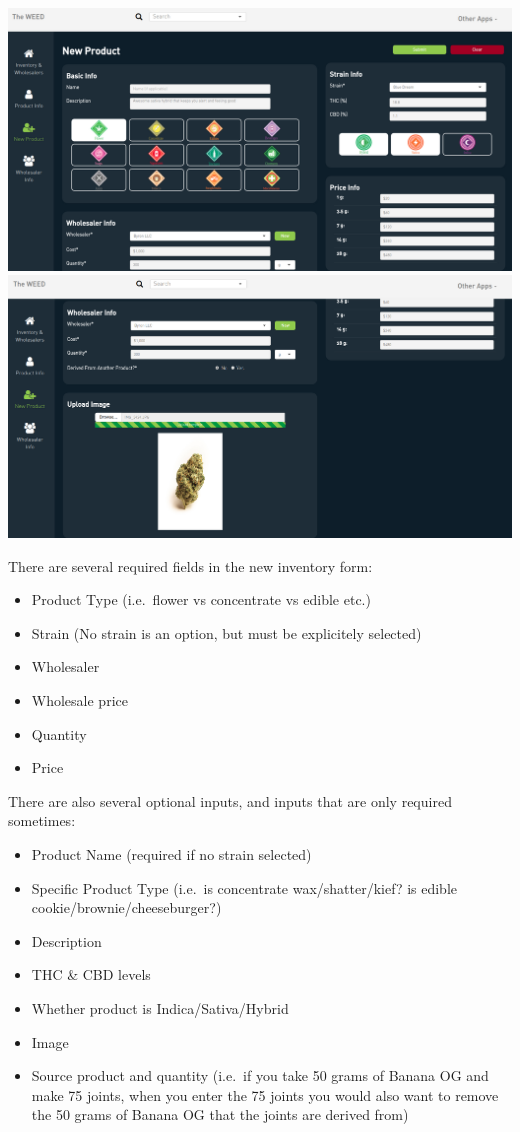 \documentclass[]{book}
\theoremstyle{definition}
\theoremstyle{definition}
\theoremstyle{definition}
\theoremstyle{remark}
\begin{document}
\includegraphics{images/newInv3.png}
\includegraphics{images/newInv4.png}

There are several required fields in the new inventory form:

\begin{itemize}
\item
  Product Type (i.e.~flower vs concentrate vs edible etc.)
\item
  Strain (No strain is an option, but must be explicitely selected)
\item
  Wholesaler
\item
  Wholesale price
\item
  Quantity
\item
  Price
\end{itemize}

There are also several optional inputs, and inputs that are only
required sometimes:

\begin{itemize}
\item
  Product Name (required if no strain selected)
\item
  Specific Product Type (i.e.~is concentrate wax/shatter/kief? is edible
  cookie/brownie/cheeseburger?)
\item
  Description
\item
  THC \& CBD levels
\item
  Whether product is Indica/Sativa/Hybrid
\item
  Image
\item
  Source product and quantity (i.e.~if you take 50 grams of Banana OG
  and make 75 joints, when you enter the 75 joints you would also want
  to remove the 50 grams of Banana OG that the joints are derived from)
\end{itemize}
\end{document}
